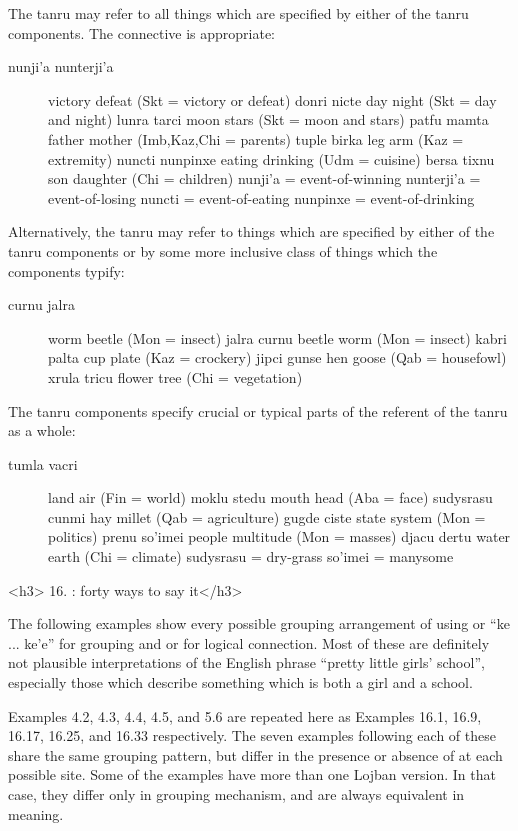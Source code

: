 The tanru may refer to all things which are specified by either
    of the tanru components. The connective  is appropriate: 
\begin{description}
\item[nunji'a nunterji'a] victory defeat (Skt = victory or defeat) donri nicte day night (Skt = day and night) lunra tarci moon stars (Skt = moon and stars) patfu mamta father mother (Imb,Kaz,Chi = parents) tuple birka leg arm (Kaz = extremity) nuncti nunpinxe eating drinking (Udm = cuisine) bersa tixnu son daughter (Chi = children) nunji'a = event-of-winning nunterji'a = event-of-losing nuncti = event-of-eating nunpinxe = event-of-drinking
\end{description}

Alternatively, the tanru may refer to things which are
    specified by either of the tanru components or by some more
    inclusive class of things which the components typify: 
\begin{description}
\item[curnu jalra] worm beetle (Mon = insect) jalra curnu beetle worm (Mon = insect) kabri palta cup plate (Kaz = crockery) jipci gunse hen goose (Qab = housefowl) xrula tricu flower tree (Chi = vegetation)
\end{description}

The tanru components specify crucial or typical parts of the
    referent of the tanru as a whole: 
\begin{description}
\item[tumla vacri] land air (Fin = world) moklu stedu mouth head (Aba = face) sudysrasu cunmi hay millet (Qab = agriculture) gugde ciste state system (Mon = politics) prenu so'imei people multitude (Mon = masses) djacu dertu water earth (Chi = climate) sudysrasu = dry-grass so'imei = manysome

\end{description}

<h3>\label{sec:5:16}
16. : forty ways to say
    it</h3>

The following examples show every possible grouping
    arrangement of  using  or ``ke
    ... ke'e'' for grouping and  or  for logical
    connection. Most of these are definitely not plausible
    interpretations of the English phrase ``pretty little girls'
    school'', especially those which describe something which is
    both a girl and a school.

Examples 4.2, 4.3, 4.4, 4.5, and 5.6 are repeated here as
    Examples 16.1, 16.9, 16.17, 16.25, and 16.33 respectively. The
    seven examples following each of these share the same grouping
    pattern, but differ in the presence or absence of  at
    each possible site. Some of the examples have more than one
    Lojban version. In that case, they differ only in grouping
    mechanism, and are always equivalent in meaning.

